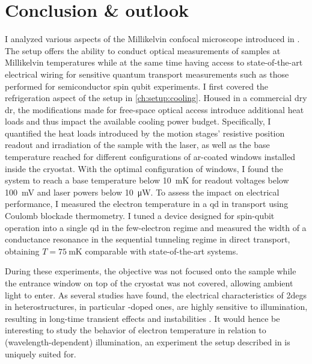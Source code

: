 \chapter{Conclusion \& outlook}\label{ch:setup:conclusion}
 \thispart I analyzed various aspects of the Millikelvin confocal microscope introduced in .
The setup offers the ability to conduct optical measurements of samples at Millikelvin temperatures while at the same time having access to state-of-the-art electrical wiring for sensitive quantum transport measurements such as those performed for semiconductor spin qubit experiments.
I first covered the refrigeration aspect of the setup in \cref{ch:setup:cooling}.
Housed in a commercial dry \gls{dr}, the modifications made for free-space optical access introduce additional heat loads and thus impact the available cooling power budget.
Specifically, I quantified the heat loads introduced by the motion stages' resistive position readout and irradiation of the sample with the laser, as well as the base temperature reached for different configurations of \gls{ar}-coated windows installed inside the cryostat.
With the optimal configuration of windows, I found the system to reach a base temperature below \qty{10}{\milli\kelvin} for readout voltages below \qty{100}{\milli\volt} and laser powers below \qty{10}{\micro\watt}.
To assess the impact on electrical performance, I measured the electron temperature in a \GaAsAlGaAs \acrlong{qd} in transport using Coulomb blockade thermometry.
I tuned a device designed for spin-qubit operation into a single \acrlong{qd} in the few-electron regime and measured the width of a conductance resonance in the sequential tunneling regime in direct transport, obtaining $T = \qty{75}{\milli\kelvin}$ comparable with state-of-the-art systems.

During these experiments, the objective was not focused onto the sample while the entrance window on top of the cryostat was not covered, allowing ambient light to enter.
As several studies have found, the electrical characteristics of \glspl{2deg} in \GaAsAlGaAs heterostructures, in particular -doped ones, are highly sensitive to illumination, resulting in long-time transient effects and instabilities \cite{Fujita2021,Shetty2022,Wang2023,Reznikov2024}.
It would hence be interesting to study the behavior of electron temperature in relation to (wavelength-dependent) illumination, an experiment the setup described in \thispart is uniquely suited for.

